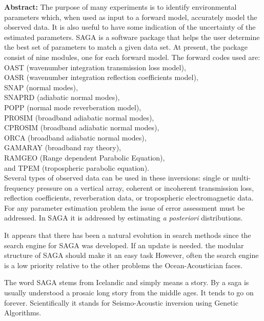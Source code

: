 \documentclass{saclantc}
\begin{document}
\begin{prelims}
{\bf Abstract:}
The purpose of many experiments is to identify environmental 
parameters which, when
used as input to a forward model, accurately model the observed data.
It is also useful to have some indication of the
uncertainty of the estimated parameters.
{\sf SAGA } is a software package that helps the user
determine the best set of parameters to match a given data set.
At present, the package consist  of nine modules, one for each forward
model.  The forward codes used are: \\
{\sf OAST} (wavenumber integration transmission loss model),\\ 
{\sf OASR} (wavenumber integration reflection coefficients model), \\ 
{\sf SNAP} (normal modes), \\
{\sf SNAPRD} (adiabatic normal modes), \\
{\sf POPP} (normal mode reverberation model), \\
{\sf PROSIM} (broadband adiabatic normal modes),\\
{\sf CPROSIM} (broadband adiabatic normal modes),\\
{\sf ORCA} (broadband adiabatic normal modes),\\
{\sf GAMARAY} (broadband ray theory),\\
{\sf RAMGEO} (Range dependent Parabolic Equation),\\
 and  {\sf TPEM} (tropospheric parabolic equation).\\
Several types of observed data can be used in these inversions:
single or multi-frequency pressure on a vertical array, coherent or incoherent
transmission loss, reflection coefficients, reverberation data, or
tropospheric electromagnetic data.
For any parameter estimation problem the issue of error assessment must
be addressed. In {\sf SAGA} it is addressed by estimating {\it a
posteriori} distributions.

It appears that there has been a natural evolution in search
methods since the search engine for {\sf SAGA} was developed. 
If an update is needed.
the
modular structure of {\sf SAGA} should make it an easy task 
However, often the search engine is a low priority relative to the
other problems the Ocean-Acoustician faces.

The word {\sf SAGA} stems from Icelandic and simply means a story. 
By a saga is usually understood a prosaic long story from the middle
ages. It tends to go on forever.
Scientifically it stands for  
{\sf S}eismo-{\sf A}coustic inversion using {\sf G}enetic {\sf A}lgorithms.


\end{prelims}
\end{document}
